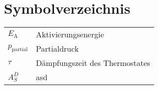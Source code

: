 %
%


\chapter*{Symbolverzeichnis}
\def\listacronymname{Symbolverzeichnis}

\begin{tabularx}{\linewidth}{ll}
$E_\text{A}$       & Aktivierungsenergie            \\
$p_\text{partial}$ & Partialdruck                   \\
$\tau$             & Dämpfungszeit des Thermostates \\
$A_S^D$            & asd                            \\
\end{tabularx}


\cleardoublepage
{} %
